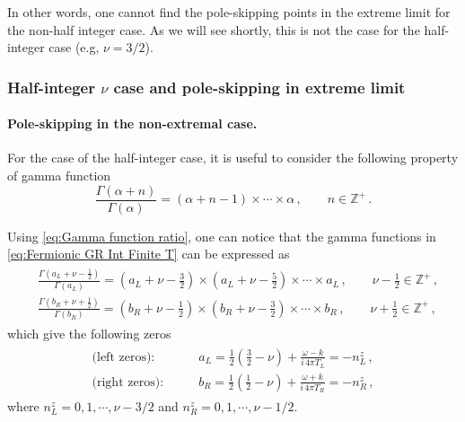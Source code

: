 \documentclass[11pt,a4paper]{article}
\begin{document}
In other words, one cannot find the pole-skipping points in the extreme limit for the non-half integer case. As we will see shortly, this is not the case for the half-integer case (e.g, $\nu=3/2$).
 




\subsubsection{Half-integer $\nu$ case and pole-skipping in extreme limit} \label{subsec:Half-integer p-s Fermi}

\paragraph{Pole-skipping in the non-extremal case.} 
For the case of the half-integer case, it is useful to consider the following property of gamma function
\begin{equation}\label{eq:Gamma function ratio}
    \frac{\Gamma(\alpha+n)}{\Gamma(\alpha)}=(\alpha+n-1)\times\cdots \times \alpha \,, \qquad n \in \mathbb{Z}^{+} \,.
\end{equation}

Using \eqref{eq:Gamma function ratio}, one can notice that the gamma functions in \eqref{eq:Fermionic GR Int Finite T} can be expressed as
\begin{align}\label{GMFR12}
\begin{split}
&\frac{\Gamma(a_{L}+\nu-\frac{1}{2})}{\Gamma(a_{L})}=\left(a_{L}+\nu-\frac{3}{2}\right)\times \left(a_{L}+\nu-\frac{5}{2}\right)\times \cdots \times a_{L} \,, \qquad \nu-\frac{1}{2} \in \mathbb{Z}^{+} \,, \\
%
&\frac{\Gamma(b_{R}+\nu+\frac{1}{2})}{\Gamma(b_{R})}= \left(b_{R}+\nu-\frac{1}{2}\right)\times \left(b_{R}+\nu-\frac{3}{2}\right) \times \cdots \times b_{R} \,, \qquad \nu+\frac{1}{2} \in \mathbb{Z}^{+} \,,
\end{split}
\end{align}
which give the following zeros
\begin{align}\label{zerosnhi1}
\begin{split}
    \text{(left zeros):} \qquad & {a}_L = \frac{1}{2}\left( \frac{3}{2} - \nu \right) +\frac{\omega-k}{i \, 4 \pi T_L} = - n^z_L  \,,\\
    \text{(right zeros):} \qquad & {b}_R = \frac{1}{2}\left(\frac{1}{2} - \nu \right) + \frac{\omega+k}{i \, 4 \pi T_R} = - n^z_R\,,
\end{split}
\end{align}
where $n^z_L=0,1,\cdots, \nu-{3}/{2}$ and $n^z_R=0,1,\cdots, \nu-{1}/{2}$.
\end{document}

